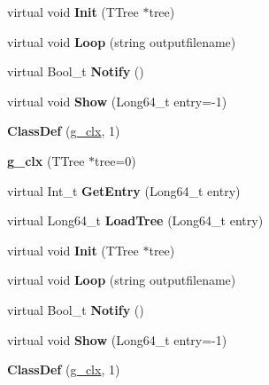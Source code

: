 \begin{DoxyCompactItemize}
\item 
\mbox{\label{classg__clx_a92531261155ea15bee6b74c7e491132a}} 
virtual void {\bfseries Init} (T\+Tree $\ast$tree)
\item 
\mbox{\label{classg__clx_aeb5d4743fbc3fa60d189ed91e4c6e246}} 
virtual void {\bfseries Loop} (string outputfilename)
\item 
\mbox{\label{classg__clx_a1fe81316168bc18dc2325ca5595577a9}} 
virtual Bool\+\_\+t {\bfseries Notify} ()
\item 
\mbox{\label{classg__clx_ae86183470c7bb8db45753aa4c86f1d41}} 
virtual void {\bfseries Show} (Long64\+\_\+t entry=-\/1)
\item 
\mbox{\label{classg__clx_a8d0a8ed3a7cc55ca97aeb77f4183d3b8}} 
{\bfseries Class\+Def} (\hyperlink{classg__clx}{g\+\_\+clx}, 1)
\item 
\mbox{\label{classg__clx_aa619daf508fe1d6bddb000af26630f31}} 
{\bfseries g\+\_\+clx} (T\+Tree $\ast$tree=0)
\item 
\mbox{\label{classg__clx_ab4c53e12e70c3671ff8895fc388dd7d2}} 
virtual Int\+\_\+t {\bfseries Get\+Entry} (Long64\+\_\+t entry)
\item 
\mbox{\label{classg__clx_a0aab3745bdb3db08757c974eebffbe39}} 
virtual Long64\+\_\+t {\bfseries Load\+Tree} (Long64\+\_\+t entry)
\item 
\mbox{\label{classg__clx_a92531261155ea15bee6b74c7e491132a}} 
virtual void {\bfseries Init} (T\+Tree $\ast$tree)
\item 
\mbox{\label{classg__clx_aeb5d4743fbc3fa60d189ed91e4c6e246}} 
virtual void {\bfseries Loop} (string outputfilename)
\item 
\mbox{\label{classg__clx_a1fe81316168bc18dc2325ca5595577a9}} 
virtual Bool\+\_\+t {\bfseries Notify} ()
\item 
\mbox{\label{classg__clx_ae86183470c7bb8db45753aa4c86f1d41}} 
virtual void {\bfseries Show} (Long64\+\_\+t entry=-\/1)
\item 
\mbox{\label{classg__clx_a8d0a8ed3a7cc55ca97aeb77f4183d3b8}} 
{\bfseries Class\+Def} (\hyperlink{classg__clx}{g\+\_\+clx}, 1)
\end{DoxyCompactItemize}

